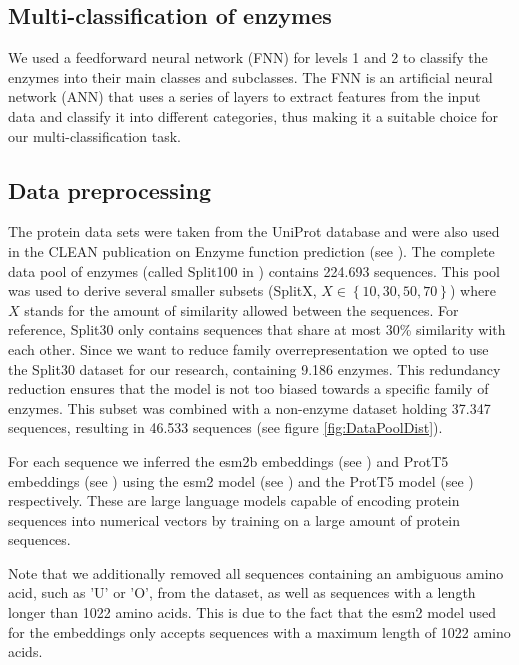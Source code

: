 \documentclass{bioinfo}
\begin{document}
\begin{methods}
\subsection{Multi-classification of enzymes}
We used a feedforward neural network (FNN) for levels 1 and 2 to classify the enzymes into their main classes and subclasses.
The FNN is an artificial neural network (ANN) that uses a series of layers to extract features from the input data and classify it into different categories,
thus making it a suitable choice for our multi-classification task. 

\subsection{Data preprocessing}

The protein data sets were taken from the UniProt database and were also used in the CLEAN publication on Enzyme function prediction (see \cite{CleanArticle}). 
The complete data pool of enzymes (called Split100 in \cite{CLEANgit}) contains 224.693 sequences. 
This pool was used to derive several smaller subsets (SplitX, $X \in \left\{10, 30, 50, 70\right\}$) where $X$ stands for the amount of similarity allowed between the sequences.
For reference, Split30 only contains sequences that share at most 30\% similarity with each other.
Since we want to reduce family overrepresentation we opted to use the Split30 dataset for our research,
containing 9.186 enzymes.
This redundancy reduction ensures that the model is not too biased towards a specific family of enzymes.
This subset was combined with a non-enzyme dataset holding 37.347 sequences, resulting in 46.533 sequences (see figure \ref{fig:DataPoolDist}).

For each sequence we inferred the esm2b embeddings (see \cite{ESM2}) and ProtT5 embeddings (see \cite{ProtT5}) 
using the esm2 model (see \cite{ESM2}) and the ProtT5 model (see \cite{ProtT5}) respectively.
These are large language models capable of encoding protein sequences into numerical vectors
by training on a large amount of protein sequences. 


Note that we additionally removed all sequences containing an ambiguous amino acid, such as 'U' or 'O', from the dataset, as well as
sequences with a length longer than 1022 amino acids. 
This is due to the fact that the esm2 model used for the embeddings only accepts sequences 
with a maximum length of 1022 amino acids. 


\end{methods}
\end{document}
